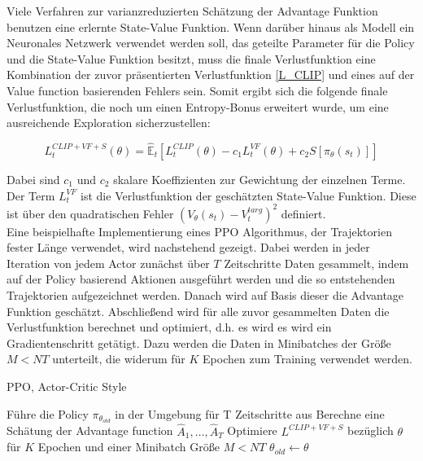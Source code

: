Viele Verfahren zur varianzreduzierten Schätzung der Advantage Funktion benutzen eine erlernte State-Value Funktion. Wenn darüber hinaus als Modell ein Neuronales Netzwerk verwendet werden soll, das geteilte Parameter für die Policy und die State-Value Funktion besitzt, muss die finale Verlustfunktion eine Kombination der zuvor präsentierten Verlustfunktion \eqref{L_CLIP} und eines auf der Value function basierenden Fehlers sein. Somit ergibt sich die folgende finale Verlustfunktion, die noch um einen Entropy-Bonus erweitert wurde, um eine ausreichende Exploration sicherzustellen:

\begin{equation}
	L_t^{CLIP+VF+S}(\theta) = \hat{\mathbb{E}}_t[L_t^{CLIP}(\theta) - c_1 L_t^{VF}(\theta) + c_2 S[\pi_\theta(s_t)]]
\end{equation}

Dabei sind $c_1$ und $c_2$ skalare Koeffizienten zur Gewichtung der einzelnen Terme. Der Term $L_t^{VF}$ ist die Verlustfunktion der geschätzten State-Value Funktion. Diese ist über den quadratischen Fehler $(V_\theta(s_t) - V_t^{targ})^2$ definiert.\\

Eine beispielhafte Implementierung eines \ac{PPO} Algorithmus, der Trajektorien fester Länge verwendet, wird nachstehend gezeigt. Dabei werden in jeder Iteration von jedem Actor zunächst über $T$ Zeitschritte Daten gesammelt, indem auf der Policy basierend Aktionen ausgeführt werden und die so entstehenden Trajektorien aufgezeichnet werden. Danach wird auf Basis dieser die Advantage Funktion geschätzt. Abschließend wird für alle zuvor gesammelten Daten die Verlustfunktion berechnet und optimiert, d.h. es wird es wird ein Gradientenschritt getätigt. Dazu werden die Daten in Minibatches der Größe $M<NT$ unterteilt, die widerum für $K$ Epochen zum Training verwendet werden.

\begin{algorithm}
	\caption{\ac{PPO}, Actor-Critic Style}
	\begin{algorithmic}
        \State Führe die Policy $\pi_{\theta_{old}}$ in der Umgebung für T Zeitschritte aus
				\State Berechne eine Schätung der Advantage function $\hat{A}_1,\dots,\hat{A}_T$
			\EndFor
			\State Optimiere $L^{CLIP+VF+S}$ bezüglich $\theta$ für $K$ Epochen und einer Minibatch Größe $M<NT$
			\State $\theta_{old} \gets \theta$
		\EndFor
	\end{algorithmic}
\end{algorithm}


